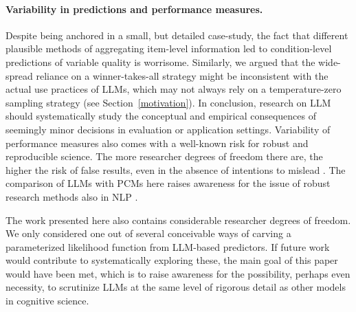 \documentclass[fleqn]{article}
\begin{document}
\paragraph{Variability in predictions and performance measures.}
Despite being anchored in a small, but detailed case-study, the fact that different plausible methods of aggregating item-level information led to condition-level predictions of variable quality is worrisome.
Similarly, we argued that the wide-spread reliance on a winner-takes-all strategy might be inconsistent with the actual use practices of LLMs, which may not always rely on a temperature-zero sampling strategy (see Section~\ref{motivation}).
In conclusion, research on LLM should systematically study the conceptual and empirical consequences of seemingly minor decisions in evaluation or application settings.
Variability of performance measures also comes with a well-known risk for robust and reproducible science.
The more researcher degrees of freedom there are, the higher the risk of false results, even in the absence of intentions to mislead \citep[e.g.][]{Ioannidis2005:Why-Most-Publis,Chambers2017:The-Seven-Deadl}.
The comparison of LLMs with PCMs here raises awareness for the issue of robust research methods also in NLP \citep{WielingRawee2018:Reproducibility}.

The work presented here also contains considerable researcher degrees of freedom.
We only considered one out of several conceivable ways of carving a parameterized likelihood function from LLM-based predictors.
If future work would contribute to systematically exploring these, the main goal of this paper would have been met, which is to raise awareness for the possibility, perhaps even necessity, to scrutinize LLMs at the same level of rigorous detail as other models in cognitive science.
\end{document}
